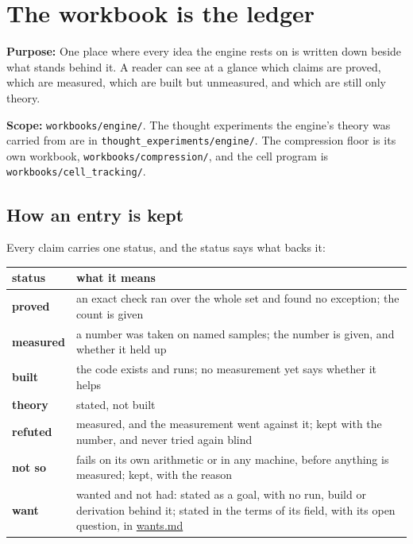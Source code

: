 \chapter{\texorpdfstring{The workbook is the ledger}{The workbook is the ledger}}
\label{chap:readme}

\textbf{Purpose:} One place where every idea the engine rests on is written down beside what stands behind it. A reader can see at a glance which claims are proved, which are measured, which are built but unmeasured, and which are still only theory.

\textbf{Scope:} \texttt{workbooks/\allowbreak{}engine/\allowbreak{}}. The thought experiments the engine's theory was carried from are in \texttt{thought\_\allowbreak{}experiments/\allowbreak{}engine/\allowbreak{}}. The compression floor is its own workbook, \texttt{workbooks/\allowbreak{}compression/\allowbreak{}}, and the cell program is \texttt{workbooks/\allowbreak{}cell\_\allowbreak{}tracking/\allowbreak{}}.

\section{\texorpdfstring{How an entry is kept}{How an entry is kept}}

Every claim carries one status, and the status says what backs it:

{\small
\setlength{\tabcolsep}{6pt}
\begin{longtable}{>{\RaggedRight\arraybackslash}p{}>{\RaggedRight\arraybackslash}p{}}
\toprule
status & what it means \\
\midrule
\endhead
\textbf{proved} & an exact check ran over the whole set and found no exception; the count is given \\
\textbf{measured} & a number was taken on named samples; the number is given, and whether it held up \\
\textbf{built} & the code exists and runs; no measurement yet says whether it helps \\
\textbf{theory} & stated, not built \\
\textbf{refuted} & measured, and the measurement went against it; kept with the number, and never tried again blind \\
\textbf{not so} & fails on its own arithmetic or in any machine, before anything is measured; kept, with the reason \\
\textbf{want} & wanted and not had: stated as a goal, with no run, build or derivation behind it; stated in the terms of its field, with its open question, in \hyperref[chap:wants]{wants.md} \\
\bottomrule
\end{longtable}
}

